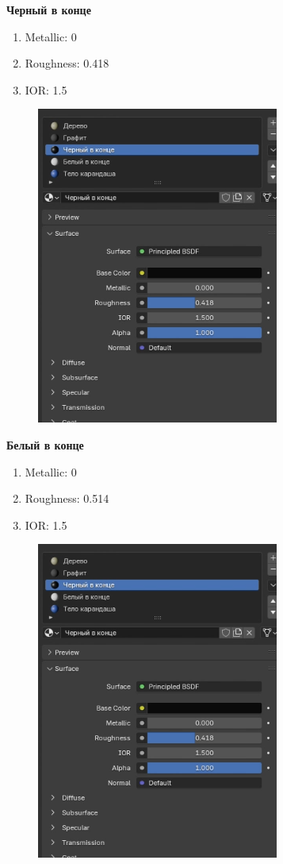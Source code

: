 \documentclass[areasetadvanced]{scrartcl}
\begin{document}
\par \textbf{Черный в конце}
\begin{enumerate}
    \item Metallic: 0
    \item Roughness: 0.418
    \item IOR: 1.5
\end{enumerate}

\begin{figure}[H]
    \label{4} 
    \centering
    \includegraphics[width=0.4\linewidth]{pen/17.png}
\end{figure}

\par \textbf{Белый в конце}
\begin{enumerate}
    \item Metallic: 0
    \item Roughness: 0.514
    \item IOR: 1.5
\end{enumerate}

\begin{figure}[H]
    \label{4} 
    \centering
    \includegraphics[width=0.4\linewidth]{pen/17.png}
\end{figure}
\end{document}
